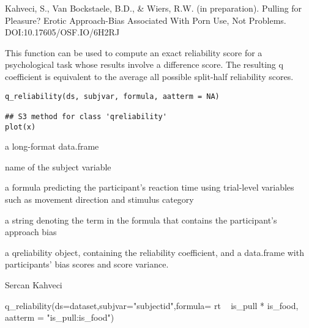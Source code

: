 \documentclass[a4paper]{book}
\begin{document}
%
\begin{References}\relax
Kahveci, S., Van Bockstaele, B.D., \& Wiers, R.W. (in preparation).
Pulling for Pleasure? Erotic Approach-Bias Associated With Porn Use, Not Problems. DOI:10.17605/OSF.IO/6H2RJ
\end{References}
%
\begin{Description}\relax
This function can be used to compute an exact reliability score for a psychological task whose results involve a difference score.
The resulting q coefficient is equivalent to the average all possible split-half reliability scores.
\end{Description}
%
\begin{Usage}
\begin{verbatim}
q_reliability(ds, subjvar, formula, aatterm = NA)

## S3 method for class 'qreliability'
plot(x)
\end{verbatim}
\end{Usage}
%
\begin{Arguments}
\begin{ldescription}
\item[\code{ds}] a long-format data.frame

\item[\code{subjvar}] name of the subject variable

\item[\code{formula}] a formula predicting the participant's reaction time using trial-level variables such as movement direction and stimulus category

\item[\code{aatterm}] a string denoting the term in the formula that contains the participant's approach bias
\end{ldescription}
\end{Arguments}
%
\begin{Value}
a qreliability object, containing the reliability coefficient, and a data.frame with participants' bias scores and score variance.
\end{Value}
%
\begin{Author}\relax
Sercan Kahveci
\end{Author}
%
\begin{Examples}
\begin{ExampleCode}
q_reliability(ds=dataset,subjvar="subjectid",formula= rt ~ is_pull * is_food, aatterm = "is_pull:is_food")

\end{ExampleCode}
\end{Examples}
\end{document}
